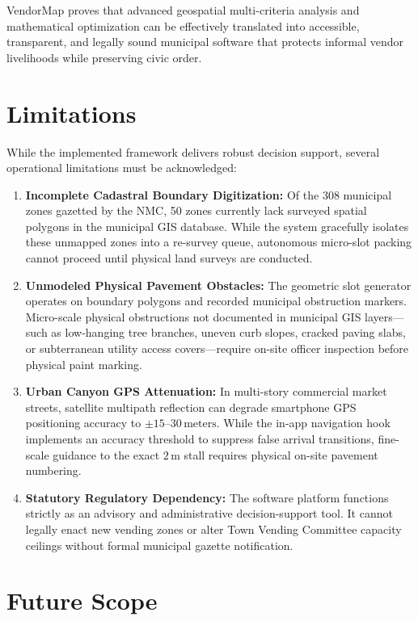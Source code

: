 VendorMap proves that advanced geospatial multi-criteria analysis and mathematical optimization can be effectively translated into accessible, transparent, and legally sound municipal software that protects informal vendor livelihoods while preserving civic order.

\section{Limitations}
\label{sec:limitations}

While the implemented framework delivers robust decision support, several operational limitations must be acknowledged:

\begin{enumerate}
    \item \textbf{Incomplete Cadastral Boundary Digitization:} Of the 308 municipal zones gazetted by the NMC, 50 zones currently lack surveyed spatial polygons in the municipal GIS database. While the system gracefully isolates these unmapped zones into a re-survey queue, autonomous micro-slot packing cannot proceed until physical land surveys are conducted.
    \item \textbf{Unmodeled Physical Pavement Obstacles:} The geometric slot generator operates on boundary polygons and recorded municipal obstruction markers. Micro-scale physical obstructions not documented in municipal GIS layers---such as low-hanging tree branches, uneven curb slopes, cracked paving slabs, or subterranean utility access covers---require on-site officer inspection before physical paint marking.
    \item \textbf{Urban Canyon GPS Attenuation:} In multi-story commercial market streets, satellite multipath reflection can degrade smartphone GPS positioning accuracy to $\pm 15$--$30\,\text{meters}$. While the in-app navigation hook implements an accuracy threshold to suppress false arrival transitions, fine-scale guidance to the exact $2\,\text{m}$ stall requires physical on-site pavement numbering.
    \item \textbf{Statutory Regulatory Dependency:} The software platform functions strictly as an advisory and administrative decision-support tool. It cannot legally enact new vending zones or alter Town Vending Committee capacity ceilings without formal municipal gazette notification.
\end{enumerate}

\section{Future Scope}
\label{sec:future_scope}

